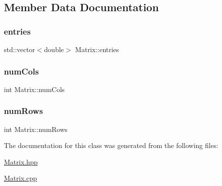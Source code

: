 \subsection{Member Data Documentation}
\mbox{\label{class_matrix_aac8f997f1cfa7b0a0ed1d11b554a8c24}} 
\subsubsection{\texorpdfstring{entries}{entries}}
{\footnotesize\ttfamily std\+::vector$<$double$>$ Matrix\+::entries}

\mbox{\label{class_matrix_a1ddb385f8482c80f98e5cdbf914ba11a}} 
\subsubsection{\texorpdfstring{num\+Cols}{numCols}}
{\footnotesize\ttfamily int Matrix\+::num\+Cols}

\mbox{\label{class_matrix_a0eb658c64c749da9cc9705dc232fcb85}} 
\subsubsection{\texorpdfstring{num\+Rows}{numRows}}
{\footnotesize\ttfamily int Matrix\+::num\+Rows}



The documentation for this class was generated from the following files\+:\begin{DoxyCompactItemize}
\item 
\mbox{\hyperlink{_matrix_8hpp}{Matrix.\+hpp}}\item 
\mbox{\hyperlink{_matrix_8cpp}{Matrix.\+cpp}}\end{DoxyCompactItemize}
